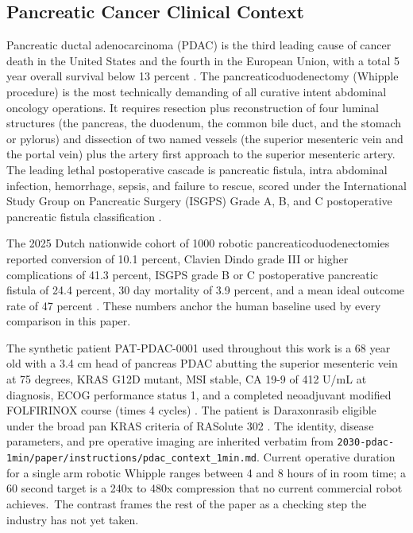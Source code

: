 \subsection{Pancreatic Cancer Clinical Context}
\label{sec:intro-pdac}

Pancreatic ductal adenocarcinoma (PDAC) is the third leading cause
of cancer death in the United States and the fourth in the
European Union, with a total 5 year overall survival below 13 percent
\cite{Siegel2025CancerStatistics}. The pancreaticoduodenectomy
(Whipple procedure) is the most technically demanding of all
curative intent abdominal oncology operations. It requires
resection plus reconstruction of four luminal structures (the
pancreas, the duodenum, the common bile duct, and the stomach or
pylorus) and dissection of two named vessels (the superior
mesenteric vein and the portal vein) plus the artery first
approach to the superior mesenteric artery. The leading lethal
postoperative cascade is pancreatic fistula, intra abdominal
infection, hemorrhage, sepsis, and failure to rescue, scored under
the International Study Group on Pancreatic Surgery (ISGPS) Grade
A, B, and C postoperative pancreatic fistula classification
\cite{Bassi2017ISGPSPostOpFistula}.

The 2025 Dutch nationwide cohort of 1000 robotic
pancreaticoduodenectomies reported conversion of 10.1 percent,
Clavien Dindo grade III or higher complications of 41.3 percent,
ISGPS grade B or C postoperative pancreatic fistula of 24.4
percent, 30 day mortality of 3.9 percent, and a mean ideal outcome
rate of 47 percent \cite{DutchCohort2025Whipple}. These numbers
anchor the human baseline used by every comparison in this paper.

The synthetic patient PAT-PDAC-0001 used throughout this work is a
68 year old with a 3.4 cm head of pancreas PDAC abutting the
superior mesenteric vein at 75 degrees, KRAS G12D mutant, MSI
stable, CA 19-9 of 412 U/mL at diagnosis, ECOG performance status
1, and a completed neoadjuvant modified FOLFIRINOX course
(times 4 cycles) \cite{Conroy2018FOLFIRINOXAdjuvant}. The patient
is Daraxonrasib eligible under the broad pan KRAS criteria of
RASolute 302 \cite{rasolute302}. The identity, disease parameters,
and pre operative imaging are inherited verbatim from
\texttt{2030-pdac-1min/paper/instructions/pdac_context_1min.md}.
Current operative duration for a single arm robotic Whipple ranges
between 4 and 8 hours of in room time; a 60 second target is a
240x to 480x compression that no current commercial robot
achieves.\ The contrast frames the rest of the paper as a checking
step the industry has not yet taken.

